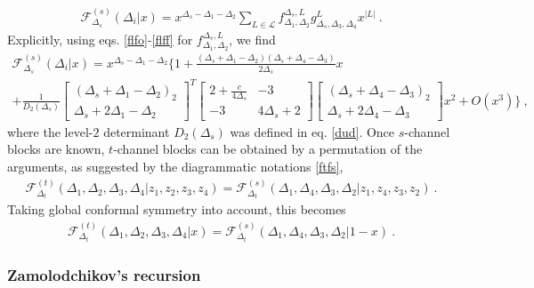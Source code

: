 \documentclass[12pt, a4paper, notitlepage, twoside]{report}
\numberwithin{equation}{section}
\theoremstyle{break}
\begin{document}
\begin{align}
 \mathcal{F}^{(s)}_{\Delta_s}(\Delta_i|x) = x^{\Delta_s-\Delta_1-\Delta_2}\sum_{L\in\mathcal{L}} f_{\Delta_1,\Delta_2}^{\Delta_s,L} g^{L}_{\Delta_s,\Delta_3,\Delta_4}x^{|L|}\ .
\label{gsd}
\end{align}
Explicitly, using eqs. \eqref{flfo}-\eqref{flff} for $f_{\Delta_1,\Delta_2}^{\Delta_s,L}$, we find 
\begin{multline}
 \mathcal{F}^{(s)}_{\Delta_s}(\Delta_i|x) 
= x^{\Delta_s - \Delta_1 - \Delta_2}\Bigg\{ 1 
+ \frac{(\Delta_s+\Delta_1-\Delta_2)(\Delta_s+\Delta_4-\Delta_3)}{2\Delta_s} x  
\\
+ \frac{1}{D_2(\Delta_s)}
\begin{bmatrix} (\Delta_s+\Delta_1-\Delta_2)_2 \\ \Delta_s+2\Delta_1-\Delta_2 \end{bmatrix}^T
\begin{bmatrix} 2+\frac{c}{4\Delta_s} & -3 \\ -3 & 4\Delta_s+2 \end{bmatrix}
\begin{bmatrix} (\Delta_s+\Delta_4-\Delta_3)_2 \\ \Delta_s+2\Delta_4-\Delta_3 \end{bmatrix}
 x^2 + O(x^3)\Bigg\}\ ,
\end{multline}
where the level-$2$ determinant $D_2(\Delta_s)$ was defined in eq. \eqref{dud}.
Once $s$-channel blocks are known, $t$-channel blocks can be obtained by a permutation of the arguments, as suggested by the diagrammatic notations \eqref{ftfs},
\begin{align}
 \mathcal{F}^{(t)}_{\Delta_t}(\Delta_1,\Delta_2,\Delta_3,\Delta_4|z_1,z_2,z_3,z_4) = \mathcal{F}^{(s)}_{\Delta_t}(\Delta_1,\Delta_4,\Delta_3,\Delta_2|z_1,z_4,z_3,z_2)\ . 
\label{gtgs}
\end{align}
Taking global conformal symmetry into account, this becomes
\begin{align}
 \mathcal{F}^{(t)}_{\Delta_t}(\Delta_1,\Delta_2,\Delta_3,\Delta_4|x) = \mathcal{F}^{(s)}_{\Delta_t}(\Delta_1,\Delta_4,\Delta_3,\Delta_2|1-x)\ .
\end{align}

\subsubsection{Zamolodchikov's recursion}
\end{document}
